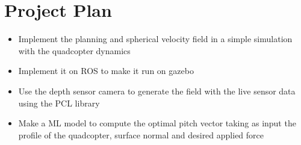\section{Project Plan}
\begin{itemize}
    \item Implement the planning and spherical velocity field in a simple simulation with the quadcopter dynamics
    \item Implement it on ROS to make it run on gazebo
    \item Use the depth sensor camera to generate the field with the live sensor data using the PCL library
    \item Make a ML model to compute the optimal pitch vector taking as input the profile of the quadcopter, surface normal and desired applied force
\end{itemize}